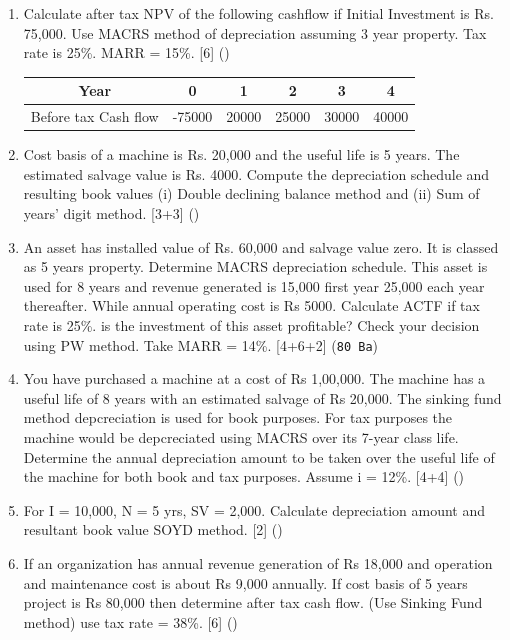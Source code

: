 \documentclass[12pt]{article}
\begin{document}
\begin{enumerate}
			\item Calculate after tax NPV of the following cashflow if Initial Investment is Rs. 75,000. Use MACRS method of depreciation assuming 3 year property. Tax rate is 25\%. MARR = 15\%. \hfill [6] ()\\
			\begin{tabular}{|c|c|c|c|c|c|}
				\hline
				Year & 0 & 1 & 2 & 3 & 4 \\ \hline
				Before tax Cash flow & -75000 & 20000 & 25000 & 30000 & 40000 \\ \hline
			\end{tabular}

			\item Cost basis of a machine is Rs. 20,000 and the useful life is 5 years. The estimated salvage value is Rs. 4000. Compute the depreciation schedule and resulting book values (i) Double declining balance method and (ii) Sum of years' digit method. \hfill [3+3] ()

			\item An asset has installed value of Rs. 60,000 and salvage value zero. It is classed as 5 years property. Determine MACRS depreciation schedule. This asset is used for 8 years and revenue generated is 15,000 first year 25,000 each year thereafter. While annual operating cost is Rs 5000. Calculate ACTF if tax rate is 25\%. is the investment of this asset profitable? Check your decision using PW method. Take MARR = 14\%. \hfill [4+6+2] (\texttt{80 Ba})

			\item You have purchased a machine at a cost of Rs 1,00,000. The machine has a useful life of 8 years with an estimated salvage of Rs 20,000. The sinking fund method depcreciation is used for book purposes. For tax purposes the machine would be depcreciated using MACRS over its 7-year class life. Determine the annual depreciation amount to be taken over the useful life of the machine for both book and tax purposes. Assume i = 12\%. \hfill [4+4] ()

			\item For I = 10,000, N = 5 yrs, SV = 2,000. Calculate depreciation amount and resultant book value SOYD method. \hfill [2] ()

			\item If an organization has annual revenue generation of Rs 18,000 and operation and maintenance cost is about Rs 9,000 annually. If cost basis of 5 years project is Rs 80,000 then determine after tax cash flow. (Use Sinking Fund method) use tax rate = 38\%. \hfill [6] ()


\end{enumerate}
\end{document}
